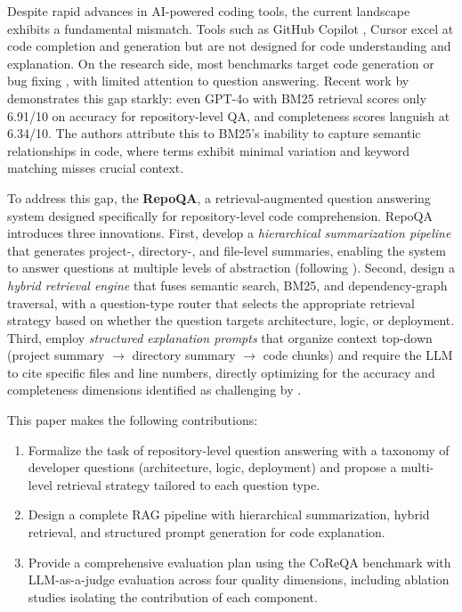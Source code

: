 \documentclass[11pt]{article}
\begin{document}
Despite rapid advances in AI-powered coding tools, the current landscape exhibits a fundamental mismatch. Tools such as GitHub Copilot \citep{chen2021evaluating}, Cursor excel at code completion and generation but are not designed for code understanding and explanation. On the research side, most benchmarks target code generation \citep{chen2021evaluating, austin2021program} or bug fixing \citep{jimenez2024swebench}, with limited attention to question answering. Recent work by \citet{chen2025coreqa} demonstrates this gap starkly: even GPT-4o with BM25 retrieval scores only 6.91/10 on accuracy for repository-level QA, and completeness scores languish at 6.34/10. The authors attribute this to BM25's inability to capture semantic relationships in code, where terms exhibit minimal variation and keyword matching misses crucial context.

To address this gap, the \textbf{RepoQA}, a retrieval-augmented question answering system designed specifically for repository-level code comprehension. RepoQA introduces three innovations. First, develop a \textit{hierarchical summarization pipeline} that generates project-, directory-, and file-level summaries, enabling the system to answer questions at multiple levels of abstraction (following \citealp{tufek2025hierarchical}). Second, design a \textit{hybrid retrieval engine} that fuses semantic search, BM25, and dependency-graph traversal, with a question-type router that selects the appropriate retrieval strategy based on whether the question targets architecture, logic, or deployment. Third, employ \textit{structured explanation prompts} that organize context top-down (project summary $\rightarrow$ directory summary $\rightarrow$ code chunks) and require the LLM to cite specific files and line numbers, directly optimizing for the accuracy and completeness dimensions identified as challenging by \citet{chen2025coreqa}.

This paper makes the following contributions:
\begin{enumerate}
    \item Formalize the task of repository-level question answering with a taxonomy of developer questions (architecture, logic, deployment) and propose a multi-level retrieval strategy tailored to each question type.
    \item Design a complete RAG pipeline with hierarchical summarization, hybrid retrieval, and structured prompt generation for code explanation.
    \item Provide a comprehensive evaluation plan using the CoReQA benchmark with LLM-as-a-judge evaluation across four quality dimensions, including ablation studies isolating the contribution of each component.
\end{enumerate}
\end{document}
